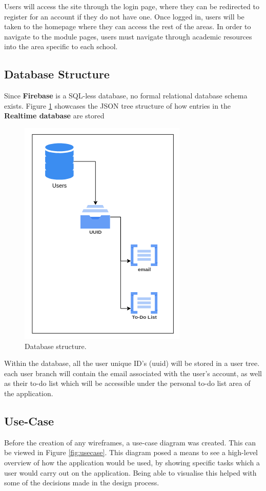 \documentclass{l4proj}
\begin{document}
Users will access the site through the login page,  where they can be redirected to register for an account if they do not have one. Once logged in,  users will be taken to the homepage where they can access the rest of the areas. In order to navigate to the module pages,  users must navigate through academic resources into the area specific to each school.

\subsection{Database Structure}
Since \textbf{Firebase} is a SQL-less database,  no formal relational database schema exists. Figure \ref{fig:ER} showcases the JSON tree structure of how entries in the \textbf{Realtime database} are stored

\begin{figure}[ht]
    \centering
    \includegraphics[width=0.35\linewidth]{images/databaseStructre.pdf}    

    \caption{Database structure.
    }

    \label{fig:ER} 
\end{figure}

Within the database,  all the user unique ID's (uuid) will be stored in a user tree. each user branch will contain the email associated with the user's account,  as well as their to-do list which will be accessible under the personal to-do list area of the application.

\subsection{Use-Case}
Before the creation of any wireframes,  a use-case diagram was created. This can be viewed in Figure \ref{fig:usecase}. This diagram posed a means to see a high-level overview of how the application would be used,  by showing specific tasks which a user would carry out on the application. Being able to visualise this helped with some of the decisions made in the design process.
\end{document}

